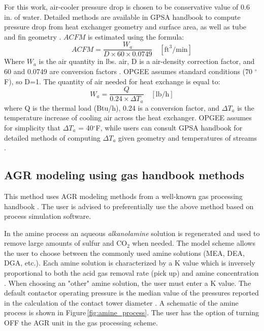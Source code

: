 \documentclass[11pt]{report}
\begin{document}
For this work, air-cooler pressure drop is chosen to be conservative value of 0.6 in. of water. Detailed methods are available in GPSA handbook to compute pressure drop from heat exchanger geometry and surface area, as well as tube and fin geometry \cite[Ch. 10]{GPSA2004}. $ACFM$ is estimated using the formula:
\begin{equation}
ACFM = \frac{W_a}{D \times 60 \times 0.0749} \quad [\textrm{ft}^3/\textrm{min}]
\end{equation}
Where $W_a$ is the air quantity in lbs. air, D is a air-density correction factor, and 60 and 0.0749 are conversion factors \cite[p. 10-16]{GPSA2004}.  OPGEE assumes standard conditions (70 $^\circ$F), so D=1. The quantity of air needed for heat exchange is equal to:
\begin{equation}
W_a = \frac{Q}{0.24 \times \Delta T_a} \quad [\textrm{lb}/\textrm{h}]
\end{equation}
where Q is the thermal load (Btu/h), 0.24 is a conversion factor, and $\Delta T_a$ is the temperature increase of cooling air across the heat exchanger. OPGEE assumes for simplicity that $\Delta T_a$ = 40$^\circ$F, while users can consult GPSA handbook for detailed methods of computing $\Delta T_a$ given geometry and temperatures of streams \cite[Ch. 10]{GPSA2004}.

\subsection{AGR modeling using gas handbook methods}

This method uses AGR modeling methods from a well-known gas processing handbook \cite{Manning1991}. The user is advised to preferentially use the above method based on process simulation software.

In the amine process an aqueous \textit{alkanolamine} solution is regenerated and used to remove large amounts of sulfur and CO$_{2}$ when needed. The model scheme allows the user to choose between the commonly used amine solutions (MEA, DEA, DGA, etc.). Each amine solution is characterized by a K value which is inversely proportional to both the acid gas removal rate (pick up) and amine concentration \cite[p. 115]{Manning1991}. When choosing an "other" amine solution, the user must enter a K value. The default contactor operating pressure is the median value of the pressures reported in the calculation of the contact tower diameter \cite{Khan1985} \cite[p. 117]{Manning1991}. A schematic of the amine process is shown in Figure\,\ref{fig:amine_process}. The user has the option of turning OFF the AGR unit in the gas processing scheme.  
\end{document}
